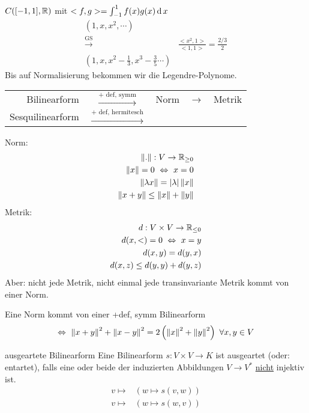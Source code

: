 \begin{Bsp}
  $C([-1,1],\mathbb{R})$ mit $<f,g>=\int^1_{-1}f(x)g(x)\operatorname{d} x$
  \begin{align*}
    (1,x,x^2,\cdots)\\
    \xrightarrow{\text{GS}}& \frac{<x^2,1>}{<1,1>}=\frac{2/3}{2}\\
    (1,x,x^2-\frac{1}{3},x^3-\frac{3}{5}\cdots)
  \end{align*}
  Bis auf Normalisierung bekommen wir die Legendre-Polynome.
\end{Bsp}
\begin{Faz}
  \begin{tabular}[htbp]{rcrcr}
    Bilinearform & $\xrightarrow{\text{+ def, symm}}$& Norm &$\xrightarrow{\text{}}$& Metrik\\
    Sesquilinearform & $\xrightarrow{\text{+ def, hermitesch}}$ & \\
  \end{tabular}
  Norm:
  \begin{align*}
    \left\| . \right\|:V\to\mathbb{R}_{\geq 0}\\
    \left\| x \right\|=0\ \Leftrightarrow \ x=0\\
    \left\| \lambda x \right\|=\left| \lambda \right|\left\| x \right\|\\
    \left\| x+y \right\|\leq \left\| x \right\| +\left\| y \right\|\\
  \end{align*}
  Metrik:
  \begin{align*}
    d:V\times V\to\mathbb{R}_{\leq 0}\\
    d(x,<)=0\ \Leftrightarrow\ x=y\\
    d(x,y)=d(y,x)\\
    d(x,z)\leq d(y,y) + d(y,z)
  \end{align*}
  Aber: nicht jede Metrik, nicht einmal jede transinvariante Metrik kommt von einer Norm.
\end{Faz}
\begin{Bem}
  Eine Norm kommt von einer +def, symm Bilinearform
  \[\Lra\ \Norm{x+y}^2+\Norm{x-y}^2=2\left(\Norm{x}^2+\Norm{y}^2\right)\ \forall x,y\in V\]
\end{Bem}
\begin{Def}{ausgeartete Bilinearform}
  Eine Bilinearform $s:V\times V\to K$ ist ausgeartet (oder: entartet), falls eine oder beide der induzierten Abbildungen $V\to V^*$ \underline{nicht} injektiv ist.
  \begin{align*}
    v \mapsto & \left( w\mapsto s(v,w) \right)\\
    v \mapsto & \left( w\mapsto s(w,v) \right)\\
  \end{align*}
\end{Def}
